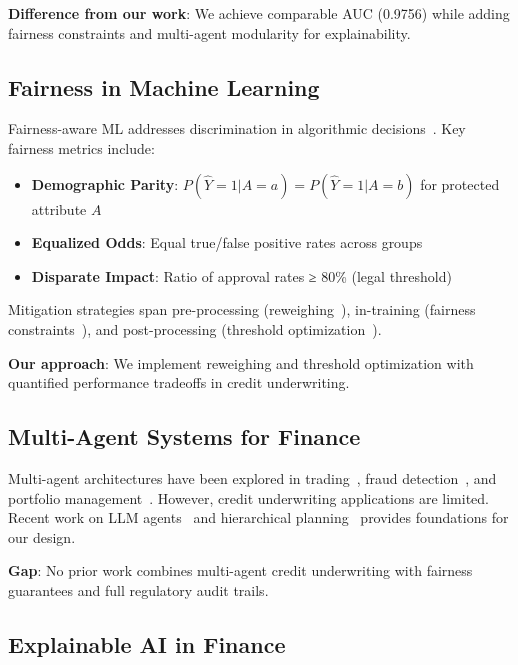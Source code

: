 \documentclass[11pt]{article}
\begin{document}
\textbf{Difference from our work}: We achieve comparable AUC (0.9756) while adding fairness constraints and multi-agent modularity for explainability.

\subsection{Fairness in Machine Learning}

Fairness-aware ML addresses discrimination in algorithmic decisions~\cite{barocas2016big, mehrabi2021survey}. Key fairness metrics include:

\begin{itemize}
    \item \textbf{Demographic Parity}: $P(\hat{Y}=1|A=a) = P(\hat{Y}=1|A=b)$ for protected attribute $A$
    \item \textbf{Equalized Odds}: Equal true/false positive rates across groups
    \item \textbf{Disparate Impact}: Ratio of approval rates ≥ 80\% (legal threshold)
\end{itemize}

Mitigation strategies span pre-processing (reweighing~\cite{kamiran2012data}), in-training (fairness constraints~\cite{agarwal2018reductions}), and post-processing (threshold optimization~\cite{hardt2016equality}).

\textbf{Our approach}: We implement reweighing and threshold optimization with quantified performance tradeoffs in credit underwriting.

\subsection{Multi-Agent Systems for Finance}

Multi-agent architectures have been explored in trading~\cite{chan2001multi}, fraud detection~\cite{phua2010comprehensive}, and portfolio management~\cite{luo2018deep}. However, credit underwriting applications are limited. Recent work on LLM agents~\cite{park2023generative} and hierarchical planning~\cite{shinn2023reflexion} provides foundations for our design.

\textbf{Gap}: No prior work combines multi-agent credit underwriting with fairness guarantees and full regulatory audit trails.

\subsection{Explainable AI in Finance}
\end{document}
